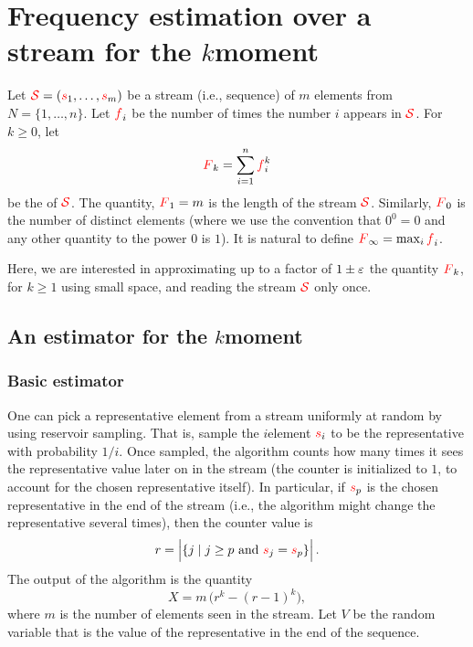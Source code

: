 \section{Frequency estimation over a stream for the %
   $k$\th moment}



Let ${\textcolor{red}{\mathcal{S}}} = ({\textcolor{red}{{s}}}_1, \ldots, {\textcolor{red}{{s}}}_m)$ be a stream (i.e., sequence)
of $m$ elements from $N = \{1,\ldots, n\}$. Let ${\textcolor{red}{f}}_i$ be the number
of times the number $i$ appears in ${\textcolor{red}{\mathcal{S}}}$. For $k \geq 0$, let
\begin{equation*}
    {\textcolor{red}{F}}_k=\sum_{i=1}^n {\textcolor{red}{f}}_i^k
\end{equation*}
be the  of ${\textcolor{red}{\mathcal{S}}}$. The quantity,
${\textcolor{red}{F}}_1=m$ is the length of the stream ${\textcolor{red}{\mathcal{S}}}$. Similarly, ${\textcolor{red}{F}}_0$ is
the number of distinct elements (where we use the convention that
$0^0=0$ and any other quantity to the power $0$ is $1$). It is natural
to define ${\textcolor{red}{F}}_\infty = \max_i {\textcolor{red}{f}}_i$.

Here, we are interested in approximating up to a factor of $1\pm {\varepsilon}$
the quantity ${\textcolor{red}{F}}_k$, for $k\geq 1$ using small space, and reading
the stream ${\textcolor{red}{\mathcal{S}}}$ only once.

\subsection{An estimator for the $k$\th moment}

\subsubsection{Basic estimator}

One can pick a representative element from a stream uniformly at
random by using reservoir sampling. That is, sample the $i$\th element
${\textcolor{red}{{s}}}_i$ to be the representative with probability $1/i$. Once
sampled, the algorithm counts how many times it sees the representative
value later on in the stream (the counter is initialized to $1$, to
account for the chosen representative itself). In particular, if
${\textcolor{red}{{s}}}_p$ is the chosen representative in the end of the stream (i.e.,
the algorithm might change the representative several times), then the
counter value is
\begin{equation*}
    r = \left| { \left\{ j \;\middle\vert\; j \geq p \text{ and } {\textcolor{red}{{s}}}_j = {\textcolor{red}{{s}}}_p \right\}\Bigr.} \right|.
\end{equation*}
The output of the algorithm is the quantity
\begin{equation*}
    X = m\, \bigl( r^k - (r-1)^k \bigr),
\end{equation*}
where $m$ is the number of elements seen in the stream.  Let $V$ be
the random variable that is the value of the representative in the end
of the sequence.

